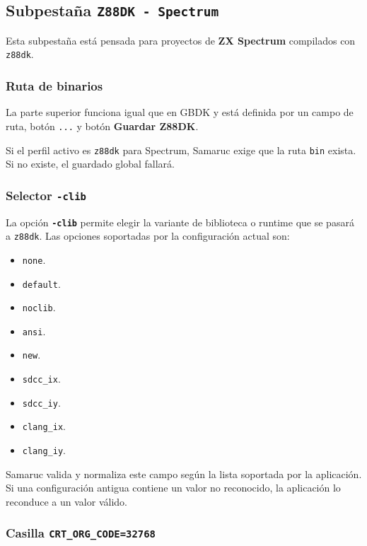 \documentclass[../../main.tex]{subfiles}
\begin{document}
\clearpage

\subsection{Subpestaña \texttt{Z88DK - Spectrum}}

Esta subpestaña está pensada para proyectos de \textbf{ZX Spectrum} compilados con \texttt{z88dk}.

\subsubsection{Ruta de binarios}

La parte superior funciona igual que en GBDK y está definida por un campo de ruta, botón \texttt{...} y botón \textbf{Guardar Z88DK}.

Si el perfil activo es \texttt{z88dk} para Spectrum, Samaruc exige que la ruta \texttt{bin} exista. Si no existe, el guardado global fallará.

\subsubsection{Selector \texttt{-clib}}

La opción \textbf{\texttt{-clib}} permite elegir la variante de biblioteca o runtime que se pasará a \texttt{z88dk}. Las opciones soportadas por la configuración actual son:

\begin{itemize}
    \item \texttt{none}.
    \item \texttt{default}.
    \item \texttt{noclib}.
    \item \texttt{ansi}.
    \item \texttt{new}.
    \item \texttt{sdcc\_ix}.
    \item \texttt{sdcc\_iy}.
    \item \texttt{clang\_ix}.
    \item \texttt{clang\_iy}.
\end{itemize}

Samaruc valida y normaliza este campo según la lista soportada por la aplicación. Si una configuración antigua contiene un valor no reconocido, la aplicación lo reconduce a un valor válido.

\subsubsection{Casilla \texttt{CRT\_ORG\_CODE=32768}}
\end{document}
